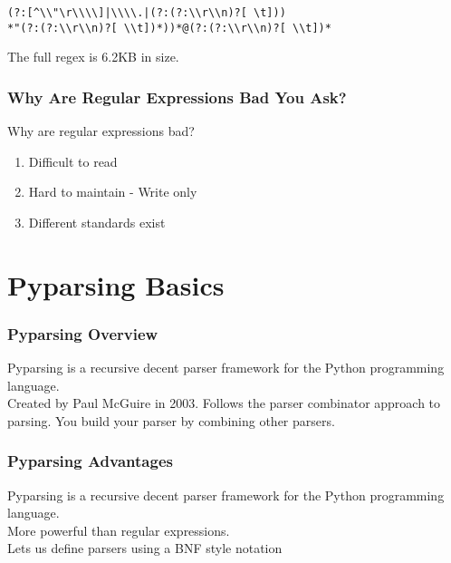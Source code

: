 \documentclass{beamer}
\begin{document}
\begin{frame}[fragile]
\begin{verbatim}
(?:[^\\"\r\\\\]|\\\\.|(?:(?:\\r\\n)?[ \t]))
*"(?:(?:\\r\\n)?[ \\t])*))*@(?:(?:\\r\\n)?[ \\t])*
\end{verbatim}
The full regex is 6.2KB in size.

\end{frame}


\begin{frame}[fragile]
\frametitle{Why Are Regular Expressions Bad You Ask?}
Why are regular expressions bad?

\begin{enumerate}
\pause
\item Difficult to read
\pause
\item Hard to maintain - Write only
\pause
\item Different standards exist
\end{enumerate}

\end{frame}

\section{Pyparsing Basics}

\begin{frame}
\frametitle{Pyparsing Overview}
Pyparsing is a recursive decent parser framework for the Python programming language. \\
\medskip
Created by Paul McGuire in 2003.
\medskip
Follows the parser combinator approach to parsing. You build your parser by combining other parsers.
\end{frame}


\begin{frame}
\frametitle{Pyparsing Advantages}
Pyparsing is a recursive decent parser framework for the Python programming language. \\
\bigskip
More powerful than regular expressions.\\
\bigskip
Lets us define parsers using a BNF style notation
\end{frame}
\end{document}
